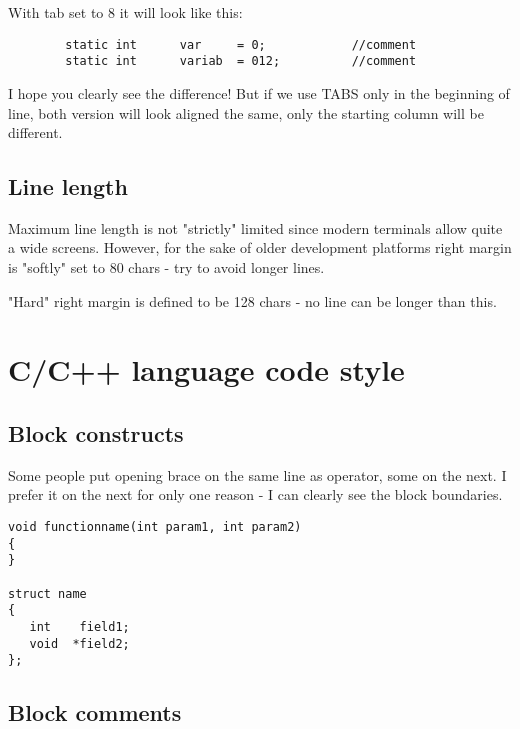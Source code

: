 \documentclass[onecolumn]{article}
\begin{document}
\par With tab set to 8 it will look like this:

\small
\begin{verbatim}
        static int      var     = 0;            //comment
        static int      variab  = 012;          //comment
\end{verbatim}
\normalsize

\par I hope you clearly see the difference! But if we use TABS only in the beginning of line,
both version will look aligned the same, only the starting column will be different.


\subsection{Line length}

\par Maximum line length is not "strictly" limited since modern terminals allow quite a wide screens.
However, for the sake of older development platforms right margin is "softly" set to 80 chars - try to
avoid longer lines.

\par "Hard" right margin is defined to be 128 chars - no line can be longer than this.



\section{C/C++ language code style}


\subsection{Block constructs}

\par Some people put opening brace on the same line as operator, some on the next.
I prefer it on the next for only one reason - I can clearly see the block boundaries.
  
\small
\begin{verbatim}
void functionname(int param1, int param2)
{
}
  
struct name
{
   int    field1;
   void  *field2;
};
\end{verbatim}
\normalsize


\subsection{Block comments}
\end{document}
